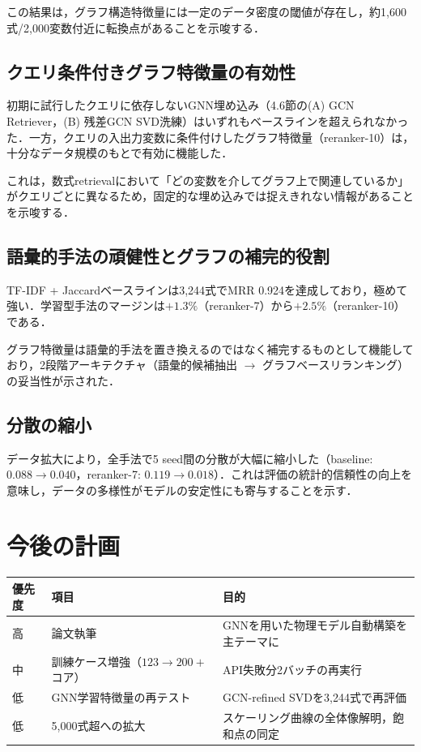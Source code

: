 \documentclass[11pt,a4paper]{ltjsarticle}
\begin{document}
この結果は，グラフ構造特徴量には一定のデータ密度の閾値が存在し，約1,600式/2,000変数付近に転換点があることを示唆する．

\subsection{クエリ条件付きグラフ特徴量の有効性}

初期に試行したクエリに依存しないGNN埋め込み（4.6節の(A) GCN Retriever，(B) 残差GCN SVD洗練）はいずれもベースラインを超えられなかった．一方，クエリの入出力変数に条件付けしたグラフ特徴量（reranker-10）は，十分なデータ規模のもとで有効に機能した．

これは，数式retrievalにおいて「どの変数を介してグラフ上で関連しているか」がクエリごとに異なるため，固定的な埋め込みでは捉えきれない情報があることを示唆する．

\subsection{語彙的手法の頑健性とグラフの補完的役割}

TF-IDF + Jaccardベースラインは3,244式でMRR 0.924を達成しており，極めて強い．学習型手法のマージンは$+1.3\%$（reranker-7）から$+2.5\%$（reranker-10）である．

グラフ特徴量は語彙的手法を置き換えるのではなく補完するものとして機能しており，2段階アーキテクチャ（語彙的候補抽出 $\to$ グラフベースリランキング）の妥当性が示された．

\subsection{分散の縮小}

データ拡大により，全手法で5 seed間の分散が大幅に縮小した（baseline: $0.088 \to 0.040$，reranker-7: $0.119 \to 0.018$）．これは評価の統計的信頼性の向上を意味し，データの多様性がモデルの安定性にも寄与することを示す．

\section{今後の計画}

\begin{table}[h]
\centering
\begin{tabular}{llp{8cm}}
\toprule
優先度 & 項目 & 目的 \\
\midrule
高 & 論文執筆 & GNNを用いた物理モデル自動構築を主テーマに \\
中 & 訓練ケース増強（$123 \to 200+$コア） & API失敗分2バッチの再実行 \\
低 & GNN学習特徴量の再テスト & GCN-refined SVDを3,244式で再評価 \\
低 & 5,000式超への拡大 & スケーリング曲線の全体像解明，飽和点の同定 \\
\bottomrule
\end{tabular}
\end{table}
\end{document}
